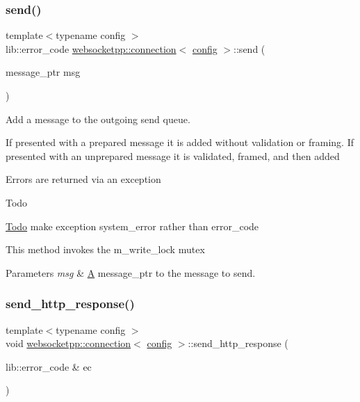 \subsubsection{\texorpdfstring{send()}{send()}\hspace{0.1cm}{\footnotesize\ttfamily [3/3]}}
{\footnotesize\ttfamily template$<$typename config $>$ \\
lib\+::error\+\_\+code \mbox{\hyperlink{classwebsocketpp_1_1connection}{websocketpp\+::connection}}$<$ \mbox{\hyperlink{classconfig}{config}} $>$\+::send (\begin{DoxyParamCaption}\item[{message\+\_\+ptr}]{msg }\end{DoxyParamCaption})}



Add a message to the outgoing send queue. 

If presented with a prepared message it is added without validation or framing. If presented with an unprepared message it is validated, framed, and then added

Errors are returned via an exception \begin{DoxyRefDesc}{Todo}
\item[\mbox{\hyperlink{todo__todo000005}{Todo}}]make exception system\+\_\+error rather than error\+\_\+code\end{DoxyRefDesc}


This method invokes the m\+\_\+write\+\_\+lock mutex


\begin{DoxyParams}{Parameters}
{\em msg} & \mbox{\hyperlink{struct_a}{A}} message\+\_\+ptr to the message to send. \\
\hline
\end{DoxyParams}
\mbox{\label{classwebsocketpp_1_1connection_a6c192eb26aa8be9afed7ff9e85990ea8}} 
\subsubsection{\texorpdfstring{send\+\_\+http\+\_\+response()}{send\_http\_response()}}
{\footnotesize\ttfamily template$<$typename config $>$ \\
void \mbox{\hyperlink{classwebsocketpp_1_1connection}{websocketpp\+::connection}}$<$ \mbox{\hyperlink{classconfig}{config}} $>$\+::send\+\_\+http\+\_\+response (\begin{DoxyParamCaption}\item[{lib\+::error\+\_\+code \&}]{ec }\end{DoxyParamCaption})}



